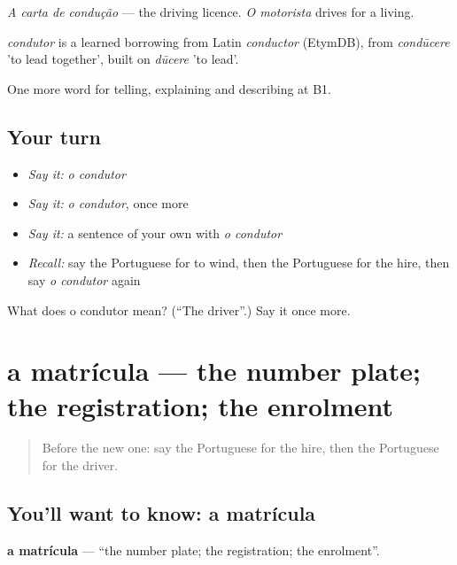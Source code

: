 \emph{A carta de condução} — the driving licence. \emph{O motorista} drives for a living.

\begin{cousinweb}
\emph{condutor} is a learned borrowing from Latin \emph{conductor} (EtymDB), from \emph{condūcere} 'to lead together', built on \emph{dūcere} 'to lead'.
\end{cousinweb}

\begin{grammarlens}[title={What you've built}]
One more word for telling, explaining and describing at B1.
\end{grammarlens}

\subsection*{Your turn}
\begin{itemize}
\raggedright
  \item \emph{Say it:} \emph{o condutor}
  \item \emph{Say it:} \emph{o condutor}, once more
  \item \emph{Say it:} a sentence of your own with \emph{o condutor}
  \item \emph{Recall:} say the Portuguese for to wind, then the Portuguese for the hire, then say \emph{o condutor} again
\end{itemize}

\begin{tcolorbox}[breakable,colback=teal!4,colframe=teal!35!black,title={Before you move on}]
What does o condutor mean? (\textquotedblleft{}The driver\textquotedblright{}.) Say it once more.
\end{tcolorbox}
\section[a matrícula]{a matrícula — the number plate; the registration; the enrolment}

\label{lesson:PT-C411-matricula}



\begin{quote}
Before the new one: say the Portuguese for the hire, then the Portuguese for the driver.
\end{quote}

\subsection*{You'll want to know: a matrícula}
\textbf{a matrícula} — \textquotedblleft{}the number plate; the registration; the enrolment\textquotedblright{}.

